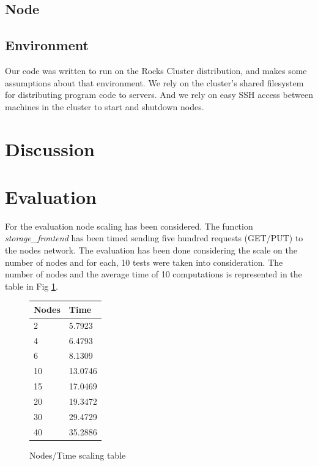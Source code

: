 \documentclass[11pt,conference]{IEEEtran}
\begin{document}
\subsection{Node}



\subsection{Environment}

Our code was written to run on the Rocks Cluster distribution\cite{rocks}, and
makes some assumptions about that environment. We rely on the cluster's shared
filesystem for distributing program code to servers. And we rely on easy SSH
access between machines in the cluster to start and shutdown nodes.


\section{Discussion}



\section{Evaluation}
For the evaluation node scaling has been considered. The function \textit{storage\_frontend} has been timed sending five hundred requests (GET/PUT) to the nodes network. The evaluation has been done considering the scale on the number of nodes and for each, 10 tests were taken into consideration.
\newline
The number of nodes and the average time of 10 computations is represented in the table in Fig \ref{tab:scaling}.

\begin{figure}[h!]
\centering
\caption{Nodes/Time scaling table}
\begin{tabular}[H]{ | l | l | }
\hline
	Nodes & Time \\ \hline
	2 & 5.7923 \\ \hline
	4 & 6.4793 \\ \hline
	6 & 8.1309 \\ \hline
	10 & 13.0746 \\ \hline
	15 & 17.0469 \\ \hline
	20 & 19.3472 \\ \hline
	30 & 29.4729 \\ \hline
	40 & 35.2886 \\ \hline
\end{tabular}
\label{tab:scaling}
\end{figure}
\end{document}
